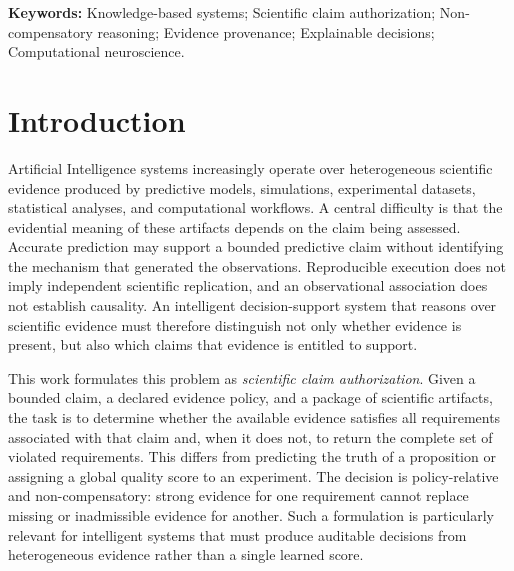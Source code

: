 \documentclass[11pt,a4paper]{article}
\begin{document}
\noindent\textbf{Keywords:} Knowledge-based systems; Scientific claim authorization; Non-compensatory reasoning; Evidence provenance; Explainable decisions; Computational neuroscience.
\vspace{1.5ex}

\linenumbers
\acresetall


\section{Introduction}
\label{sec:introduction}

Artificial Intelligence systems increasingly operate over heterogeneous
scientific evidence produced by predictive models, simulations, experimental
datasets, statistical analyses, and computational workflows. A central
difficulty is that the evidential meaning of these artifacts depends on the
claim being assessed. Accurate prediction may support a bounded predictive
claim without identifying the mechanism that generated the observations.
Reproducible execution does not imply independent scientific replication, and
an observational association does not establish causality. An intelligent
decision-support system that reasons over scientific evidence must therefore
distinguish not only whether evidence is present, but also which claims that
evidence is entitled to support.

This work formulates this problem as \emph{scientific claim authorization}.
Given a bounded claim, a declared evidence policy, and a package of scientific
artifacts, the task is to determine whether the available evidence satisfies
all requirements associated with that claim and, when it does not, to return
the complete set of violated requirements. This differs from predicting the
truth of a proposition or assigning a global quality score to an experiment.
The decision is policy-relative and non-compensatory: strong evidence for one
requirement cannot replace missing or inadmissible evidence for another.
Such a formulation is particularly relevant for intelligent systems that must
produce auditable decisions from heterogeneous evidence rather than a single
learned score.
\end{document}

